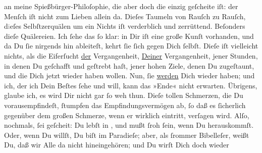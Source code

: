 \begin{ledgroupsized}[t]{13cm}
               an meine Spießbürger-Philoſophie, die aber doch die einzig geſcheite iſt: der Menſch
               iſt nicht zum Lieben allein da. Dieſes Taumeln von Rauſch zu Rauſch,
                  d\textcolor{gray}{i}eſes Selbſtzerquälen um ein Nichts iſt verderblich und
               zerrüttend. Beſonders dieſe Quälereien. Ich ſehe das ſo klar: in Dir iſt eine große
               Kunſt vorhanden, und da Du ſie nirgends hin ableiteſt, kehrt ſie ſich gegen Dich
               ſelbſt. Dieſe \label{K_L02649-2v}\label{K_L02649-2h}
               iſt vielleicht nichts, als die Eiferſucht \uline{der}
               Vergangenheit, \uline{Deiner} Vergangenheit, jener Stunden,
               in denen Du geſchafft und geſtrebt haſt, jener hohen Ziele, denen Du zugeſtaunt, und
               die Dich jetzt wieder haben wollen. Nun, ſie \uline{werden}
               Dich wieder haben; und ich, der ich Dein Beſtes ſehe und will, kann das »Ende« nicht
               erwarten. Übrigens, glaube ich, es wird Dir nicht gar ſo weh thun. Dieſe tollen
               Schmerzen, die Du vorausempfindeſt, {\pb}ſtumpfen das
               Empfindungsvermögen ab, ſo daß es ſicherlich gegenüber dem großen Schmerze, wenn er
               wirklich eintritt, verſagen wird. Alſo, nochmals, ſei geſcheit: Du lebſt in \label{K_L02649-3v}\label{K_L02649-3h},
               und mußt ſroh ſein, wenn Du herauskommſt. Oder, wenn Du willſt, Du biſt im Paradieſe;
               aber, als ſrommer Bibelleſer,  weißt Du, daß wir Alle da nicht hineingehören; und Du wirſt Dich doch wieder

\end{ledgroupsized}
